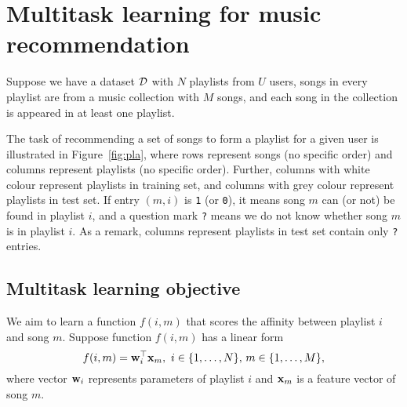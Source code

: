 \section{Multitask learning for music recommendation}
\label{sec:method}


Suppose we have a dataset $\mathcal{D}$ with $N$ playlists from $U$ users, songs in every playlist are from a music collection
with $M$ songs, and each song in the collection is appeared in at least one playlist.

The task of recommending a set of songs to form a playlist for a given user is illustrated in Figure~\ref{fig:pla},
where rows represent songs (no specific order) and columns represent playlists (no specific order).
Further, columns with white colour represent playlists in training set,
and columns with grey colour represent playlists in test set.
If entry $(m, i)$ is \texttt{1} (or \texttt{0}),
it means song $m$ can (or not) be found in playlist $i$,
and a question mark \texttt{?} means we do not know whether song $m$ is in playlist $i$.
As a remark, columns represent playlists in test set contain only \texttt{?} entries.





\subsection{Multitask learning objective}

%
We aim to learn a function $f(i, m)$ that scores the affinity between playlist $i$ and song $m$.
Suppose function $f(i, m)$ has a linear form
$$
f(i, m) = \mathbf{w}_i^\top \mathbf{x}_m, \ i \in \{1,\dots,N\}, \, m \in \{1,\dots,M\},
$$
where vector $\mathbf{w}_i$ represents parameters of playlist $i$ and $\mathbf{x}_m$ is a feature vector of song $m$.


